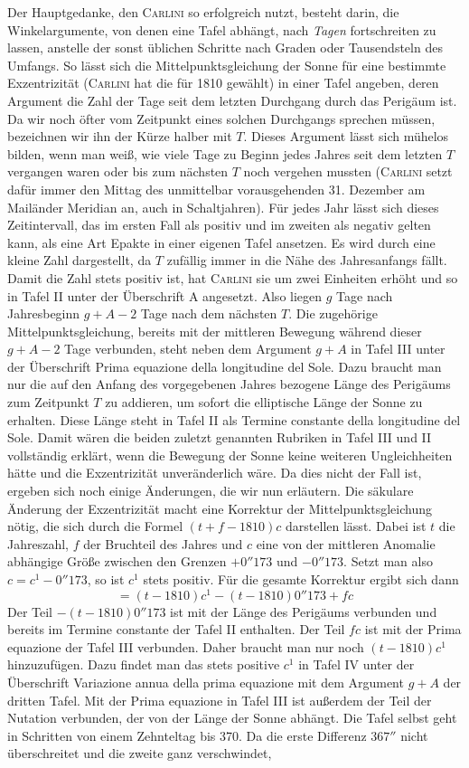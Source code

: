 Der Hauptgedanke, den \textsc{Carlini} so erfolgreich nutzt, besteht darin, die Winkelargumente, von denen eine Tafel abhängt, nach \emph{Tagen} fortschreiten zu lassen, anstelle der sonst üblichen Schritte nach Graden oder Tausendsteln des Umfangs. So lässt sich die Mittelpunktsgleichung der Sonne für eine bestimmte Exzentrizität (\textsc{Carlini} hat die für 1810 gewählt) in einer Tafel angeben, deren Argument die Zahl der Tage seit dem letzten Durchgang durch das Perigäum ist. Da wir noch öfter vom Zeitpunkt eines solchen Durchgangs sprechen müssen, bezeichnen wir ihn der Kürze halber mit $T$. Dieses Argument lässt sich mühelos bilden, wenn man weiß, wie viele Tage zu Beginn jedes Jahres seit dem letzten $T$ vergangen waren oder bis zum nächsten $T$ noch vergehen mussten (\textsc{Carlini} setzt dafür immer den Mittag des unmittelbar vorausgehenden 31. Dezember am Mailänder Meridian an, auch in Schaltjahren). Für jedes Jahr lässt sich dieses Zeitintervall, das im ersten Fall als positiv und im zweiten als negativ gelten kann, als eine Art Epakte in einer eigenen Tafel ansetzen. Es wird durch eine kleine Zahl dargestellt, da $T$ zufällig immer in die Nähe des Jahresanfangs fällt. Damit die Zahl stets positiv ist, hat \textsc{Carlini} sie um zwei Einheiten erhöht und so in Tafel II unter der Überschrift A angesetzt. Also liegen $g$ Tage nach Jahresbeginn $g+A-2$ Tage nach dem nächsten $T$. Die zugehörige Mittelpunktsgleichung, bereits mit der mittleren Bewegung während dieser $g+A-2$ Tage verbunden, steht neben dem Argument $g+A$ in Tafel III unter der Überschrift Prima equazione della longitudine del Sole. Dazu braucht man nur die auf den Anfang des vorgegebenen Jahres bezogene Länge des Perigäums zum Zeitpunkt $T$ zu addieren, um sofort die elliptische Länge der Sonne zu erhalten. Diese Länge steht in Tafel II als Termine constante della longitudine del Sole. Damit wären die beiden zuletzt genannten Rubriken in Tafel III und II vollständig erklärt, wenn die Bewegung der Sonne keine weiteren Ungleichheiten hätte und die Exzentrizität unveränderlich wäre. Da dies nicht der Fall ist, ergeben sich noch einige Änderungen, die wir nun erläutern. Die säkulare Änderung der Exzentrizität macht eine Korrektur der Mittelpunktsgleichung nötig, die sich durch die Formel $(t+f-1810)c$ darstellen lässt. Dabei ist $t$ die Jahreszahl, $f$ der Bruchteil des Jahres und $c$ eine von der mittleren Anomalie abhängige Größe zwischen den Grenzen $+0''173$ und $-0''173$. Setzt man also $c = c^1 - 0''173$, so ist $c^1$ stets positiv. Für die gesamte Korrektur ergibt sich dann \[ = (t-1810)c^1 - (t-1810)0''173 + fc \] Der Teil $-(t-1810)0''173$ ist mit der Länge des Perigäums verbunden und bereits im Termine constante der Tafel II enthalten. Der Teil $fc$ ist mit der Prima equazione der Tafel III verbunden. Daher braucht man nur noch $(t-1810)c^1$ hinzuzufügen. Dazu findet man das stets positive $c^1$ in Tafel IV unter der Überschrift Variazione annua della prima equazione mit dem Argument $g+A$ der dritten Tafel. Mit der Prima equazione in Tafel III ist außerdem der Teil der Nutation verbunden, der von der Länge der Sonne abhängt. Die Tafel selbst geht in Schritten von einem Zehnteltag bis 370. Da die erste Differenz $367''$ nicht überschreitet und die zweite ganz verschwindet, 